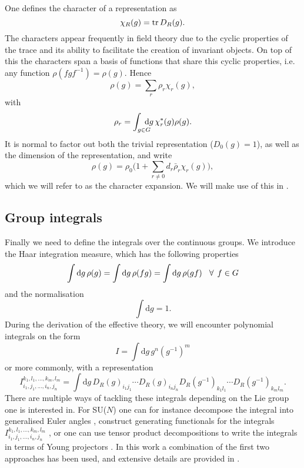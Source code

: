 One defines the character of a representation as
%
\begin{equation}
  \chi_R(g) = \operatorname{tr} D_R(g).
\end{equation}
%
The characters appear frequently in field theory due to the cyclic properties of
the trace and its ability to facilitate the creation of invariant objects. On
top of this the characters span a basis of functions that share this cyclic
properties, i.e. any function $\rho(f g f^{-1}) = \rho(g)$. Hence
%
\begin{equation}
  \rho(g) = \sum_r \rho_r \chi_r(g),
\end{equation}
%
with
\begin{equation}
  \rho_r = \int_{\mathrlap{g \in G}\hskip1.5ex} \mathrm{d}g \, \chi_r^*(g) \rho(g).
\end{equation}
%
It is normal to factor out both the trivial representation ($D_0(g) = 1$), as
well as the dimension of the representation, and write
%
\begin{equation}
  \rho(g) = \rho_0 \Big(1 + \sum_{r \neq 0} d_r \bar{\rho}_r \chi_r(g)\Big),
\end{equation}
%
which we will refer to as the character expansion. We will make use of this in
.

\subsection{Group integrals}

Finally we need to define the integrals over the continuous groups. We introduce
the Haar integration measure, which has the following properties
%
\begin{equation}
  \int \mathrm{d}g \, \rho(g) = \int \mathrm{d}g \, \rho(fg) 
    = \int \mathrm{d}g \, \rho(gf) \hskip2ex \forall \hskip1ex f \in G
\end{equation}
%
and the normalisation
%
\begin{equation}
  \int \mathrm{d}g = 1.
\end{equation}
%
During the derivation of the effective theory, we will encounter polynomial
integrals on the form
%
\begin{equation}
  I = \int \mathrm{d} g \, g^n (g^{-1})^m
\end{equation}
%
or more commonly, with a representation
%
\begin{equation}
  I_{i_1,j_1,...,i_n,j_n}^{k_1,l_1,...,k_m,l_m} = \int \mathrm{d} g \,
    D_R(g)_{i_1j_1} \cdots D_R(g)_{i_nj_n} D_R(g^{-1})_{k_1l_1} \cdots D_R(g^{-1})_{k_ml_m}.
\end{equation}
%
There are multiple ways of tackling these integrals depending on the Lie group
one is interested in. For SU($N$) one can for instance decompose the integral
into generalised Euler angles \citep[as described in][]{Tilma:2004kp}, construct
generating functionals for the integrals $I_{i_1,j_1,...,i_n,j_n}^{k_1,l_1,...,k_m,l_m}$
\citep[details in][]{Creutz:1978ub}, or one can use tensor product
decompositions to write the integrals in terms of Young projectors
\citep{Myers:2014dia}. In this work a combination of the first two approaches
has been used, and extensive details are provided in
.

